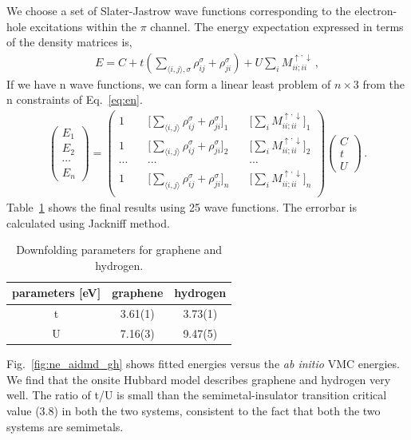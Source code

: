 \documentclass[aps, prb]{revtex4-1}
\begin{document}
We choose a set of Slater-Jastrow wave functions corresponding to the electron-hole excitations within the $\pi$ channel. The energy expectation expressed in terms of the density matrices is, 
\begin{eqnarray}\label{eq:en}
E = C + t(\sum_{\langle i, j\rangle, \sigma} \rho_{ij}^\sigma + \rho_{ji}^\sigma) + U \sum_{i}M_{ii;ii}^{\uparrow,\downarrow}\,,
\end{eqnarray}
If we have n wave functions, we can form a linear least problem of $n\times 3$ from the n constraints of Eq.~\eqref{eq:en}.
\begin{eqnarray}
\begin{pmatrix}
E_1\\
E_2\\
\cdots\\
E_n
\end{pmatrix}=
\begin{pmatrix}
1 & \quad \Big[\sum_{\langle i, j\rangle} \rho_{ij}^\sigma + \rho_{ji}^\sigma\Big]_{1} & \quad \Big[\sum_{i}M_{ii;ii}^{\uparrow,\downarrow}\Big]_1\\
1 & \quad \Big[\sum_{\langle i, j\rangle} \rho_{ij}^\sigma + \rho_{ji}^\sigma\Big]_{2} & \quad 
\Big[\sum_{i}M_{ii;ii}^{\uparrow,\downarrow}\Big]_2\\
\cdots & \quad \cdots & \quad \cdots \\ 
1 & \quad \Big[\sum_{\langle i, j\rangle} \rho_{ij}^\sigma + \rho_{ji}^\sigma\Big]_{n} & \quad 
\Big[\sum_{i}M_{ii;ii}^{\uparrow,\downarrow}\Big]_n\\
\end{pmatrix}
\begin{pmatrix}
C\\
t\\
U
\end{pmatrix}\,.
\end{eqnarray}
Table~\ref{tab:grpheffm} shows the final results using 25 wave functions. The errorbar is calculated using Jackniff method.  
\begin{table}[ht]\caption{Downfolding parameters for graphene and hydrogen.}\label{tab:grpheffm}
\centering
\begin{tabular}{|c|c|c|}
\hline
parameters [eV] & graphene &hydrogen \\
\hline
\hline
t & 3.61(1) & 3.73(1)\\
U & 7.16(3) & 9.47(5)\\
\hline
\end{tabular}
\end{table} 
Fig.~\ref{fig:ne_aidmd_gh} shows fitted energies versus the \textit{ab initio} VMC energies. We find that the onsite Hubbard model describes graphene and hydrogen very well. The ratio of t/U is small than the semimetal-insulator transition critical value (3.8) in both the two systems, consistent to the fact that both the two systems are semimetals.  
\end{document}
